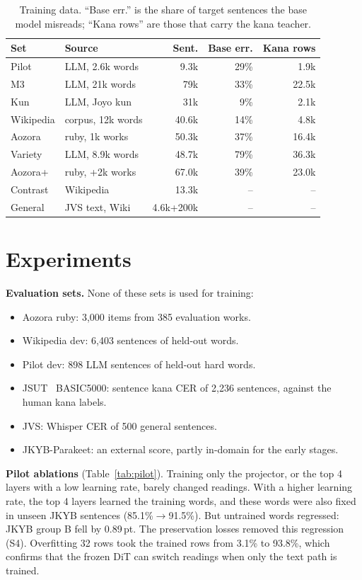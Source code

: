 \documentclass[10pt,a4paper,twocolumn]{article}
\newcommand{\pt}{\,pt}
\begin{document}
\begin{table}[t]
\centering\footnotesize\setlength{\tabcolsep}{3pt}
\caption{Training data. ``Base err.'' is the share of target sentences the base model misreads;
``Kana rows'' are those that carry the kana teacher.}
\label{tab:data}
\begin{tabular}{@{}llrrr@{}}
\toprule
Set & Source & Sent. & Base err. & Kana rows\\
\midrule
Pilot & LLM, 2.6k words & 9.3k & 29\% & 1.9k\\
M3 & LLM, 21k words & 79k & 33\% & 22.5k\\
Kun & LLM, Joyo kun & 31k & 9\% & 2.1k\\
Wikipedia & corpus, 12k words & 40.6k & 14\% & 4.8k\\
Aozora & ruby, 1k works & 50.3k & 37\% & 16.4k\\
Variety & LLM, 8.9k words & 48.7k & 79\% & 36.3k\\
Aozora+ & ruby, +2k works & 67.0k & 39\% & 23.0k\\
Contrast & Wikipedia & 13.3k & -- & --\\
General & JVS text, Wiki & 4.6k+200k & -- & --\\
\bottomrule
\end{tabular}
\end{table}

\section{Experiments}\label{sec:exp}
\textbf{Evaluation sets.} None of these sets is used for training:
\begin{itemize}
\item Aozora ruby: 3,000 items from 385 evaluation works.
\item Wikipedia dev: 6,403 sentences of held-out words.
\item Pilot dev: 898 LLM sentences of held-out hard words.
\item JSUT~\cite{jsut} BASIC5000: sentence kana CER of 2,236 sentences, against the human kana
  labels.
\item JVS: Whisper CER of 500 general sentences.
\item JKYB-Parakeet: an external score, partly in-domain for the early stages.
\end{itemize}

\textbf{Pilot ablations} (Table~\ref{tab:pilot}). Training only the projector, or the top 4
layers with a low learning rate, barely changed readings. With a higher learning rate, the top
4 layers learned the training words, and these words were also fixed in unseen JKYB sentences
(85.1\%$\to$91.5\%). But untrained words regressed: JKYB group B fell by 0.89\pt. The
preservation losses removed this regression (S4). Overfitting 32 rows took the trained rows
from 3.1\% to 93.8\%, which confirms that the frozen DiT can switch readings when only the text
path is trained.
\end{document}
